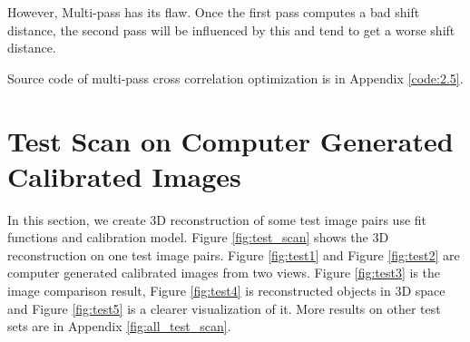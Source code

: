 However, Multi-pass has its flaw. Once the first pass computes a bad shift distance, the second pass will be influenced by this and tend to get a worse shift distance.

Source code of multi-pass cross correlation optimization is in Appendix \ref{code:2.5}.

\section{Test Scan on Computer Generated Calibrated Images}

In this section, we create 3D reconstruction of some test image pairs use fit functions and calibration model. Figure \ref{fig:test_scan} shows the 3D reconstruction on one test image pairs. Figure \ref{fig:test1} and Figure \ref{fig:test2} are computer generated calibrated images from two views. Figure \ref{fig:test3} is the image comparison result, Figure \ref{fig:test4} is reconstructed objects in 3D space and Figure \ref{fig:test5} is a clearer visualization of it. More results on other test sets are in Appendix \ref{fig:all_test_scan}.

